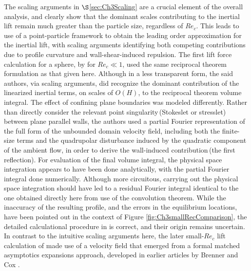 \documentclass{jfm}
\begin{document}
The scaling arguments in $\S$\ref{sec:Ch3Scaling} are a crucial element of the overall analysis, and clearly show that the dominant scales contributing to the inertial lift remain much greater than the particle size, regardless of $Re_c$. This leads to use of a  point-particle framework to obtain the leading order approximation for the inertial lift, with scaling arguments identifying both competing contributions due to profile curvature and wall-shear-induced repulsion. The first lift force calculation for a sphere, by \cite{holeal1974} for $Re_c\ll1$, used the same reciprocal theorem formulation as that given here. Although in a less transparent form, the said authors, via scaling arguments, did recognize the dominant contribution of the linearized inertial terms, on scales of $O(H)$, to the reciprocal theorem volume integral. The effect of confining plane boundaries was modeled differently. Rather than directly consider the relevant point singularity\,(Stokeslet or stresslet) between plane parallel walls, the authors used a partial Fourier representation of the full form of the unbounded domain velocity field, including both the finite-size terms and the quadrupolar disturbance induced by the quadratic component of the ambient flow, in order to derive the wall-induced contribution\,(the first reflection). For evaluation of the final volume integral, the physical space integration appears to have been done analytically, with the partial Fourier integral done numerically. Although more circuitous, carrying out the physical space integration should have led to a residual Fourier integral identical to the one obtained directly here from use of the convolution theorem. While the inaccuracy of the resulting profile, and the errors in the equilibrium locations, have been pointed out in the context of Figure \ref{fig:Ch3smallRecComparison}, the detailed calculational procedure in \cite{holeal1974} is correct, and their origin remains uncertain. In contrast to the intuitive scaling arguments here, the later small-$Re_c$ lift calculation of \cite{vasseur1976} made use of a velocity field that emerged from a formal matched asymptotics expansions approach, developed in earlier articles by Brenner and Cox \citep{cox1967,coxbrenner1968}.
\end{document}
